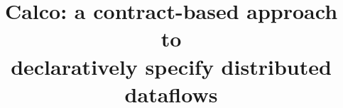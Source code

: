 \documentclass[sigconf]{acmart}
\theoremstyle{remark}
\begin{document}

\title{Calco: a contract-based approach to \\declaratively specify distributed dataflows}


\end{document}
